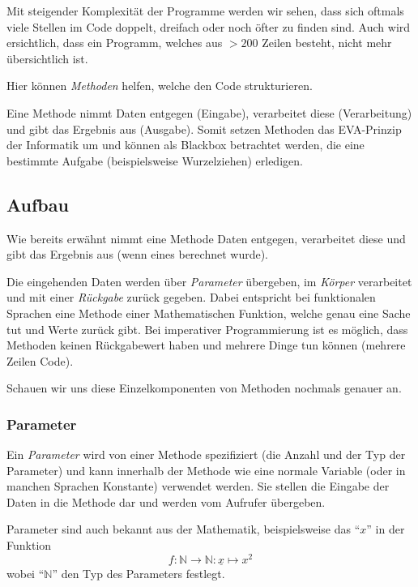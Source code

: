 
Mit steigender Komplexität der Programme werden wir sehen, dass sich oftmals viele Stellen im Code doppelt, dreifach oder noch öfter zu finden sind. Auch wird ersichtlich, dass ein Programm, welches aus $ >200 $ Zeilen besteht, nicht mehr übersichtlich ist.

Hier können \textit{Methoden} helfen, welche den Code strukturieren.

Eine Methode nimmt Daten entgegen (Eingabe), verarbeitet diese (Verarbeitung) und gibt das Ergebnis aus (Ausgabe). Somit setzen Methoden das EVA-Prinzip der Informatik um und können als Blackbox betrachtet werden, die eine bestimmte Aufgabe (beispielsweise Wurzelziehen) erledigen.

\subsection{Aufbau} \functionalMark \imperativeMark \oopMark
	Wie bereits erwähnt nimmt eine Methode Daten entgegen, verarbeitet diese und gibt das Ergebnis aus (wenn eines berechnet wurde).
	
	Die eingehenden Daten werden über \textit{Parameter} übergeben, im \textit{Körper} verarbeitet und mit einer \textit{Rückgabe} zurück gegeben. Dabei entspricht bei funktionalen Sprachen eine Methode einer Mathematischen Funktion, welche genau eine Sache tut und Werte zurück gibt. Bei imperativer Programmierung ist es möglich, dass Methoden keinen Rückgabewert haben und mehrere Dinge tun können (mehrere Zeilen Code).
	
	Schauen wir uns diese Einzelkomponenten von Methoden nochmals genauer an.

	\subsubsection{Parameter} \functionalMark \imperativeMark \oopMark
		Ein \textit{Parameter} wird von einer Methode spezifiziert (die Anzahl und der Typ der Parameter) und kann innerhalb der Methode wie eine normale Variable (oder in manchen Sprachen Konstante) verwendet werden. Sie stellen die Eingabe der Daten in die Methode dar und werden vom Aufrufer übergeben.
		
		Parameter sind auch bekannt aus der Mathematik, beispielsweise das \enquote{\(x\)} in der Funktion \[ f : \mathbb{N} \rightarrow \mathbb{N} : \underline{x} \mapsto x ^ 2 \] wobei \enquote{\(\mathbb{N}\)} den Typ des Parameters festlegt.
		
